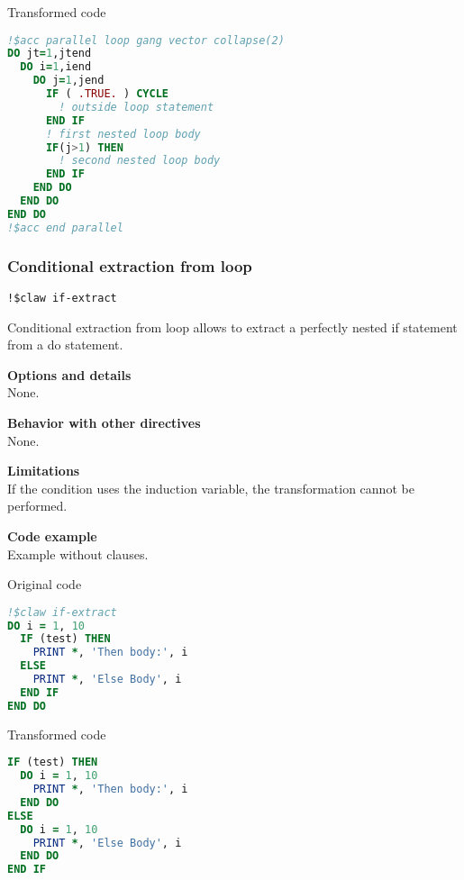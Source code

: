 Transformed code
\begin{lstlisting}[language=Fortran]
!$acc parallel loop gang vector collapse(2)
DO jt=1,jtend
  DO i=1,iend
    DO j=1,jend
      IF ( .TRUE. ) CYCLE
        ! outside loop statement
      END IF
      ! first nested loop body
      IF(j>1) THEN
        ! second nested loop body
      END IF
    END DO
  END DO
END DO
!$acc end parallel
\end{lstlisting}


\subsubsection{Conditional extraction from loop}
\begin{lstlisting}
!$claw if-extract
\end{lstlisting}

Conditional extraction from loop allows to extract a perfectly nested if
statement from a do statement.

\textbf{Options and details}\\
None.

\textbf{Behavior with other directives}\\
None.

\textbf{Limitations}\\
If the condition uses the induction variable, the transformation cannot be
performed.

\textbf{Code example}\\
\label{if-extract-1}
Example without clauses.

Original code
\begin{lstlisting}[language=Fortran]
!$claw if-extract
DO i = 1, 10
  IF (test) THEN
    PRINT *, 'Then body:', i
  ELSE
    PRINT *, 'Else Body', i
  END IF
END DO
\end{lstlisting}

Transformed code
\begin{lstlisting}[language=Fortran]
IF (test) THEN
  DO i = 1, 10
    PRINT *, 'Then body:', i
  END DO
ELSE
  DO i = 1, 10
    PRINT *, 'Else Body', i
  END DO
END IF
\end{lstlisting}
